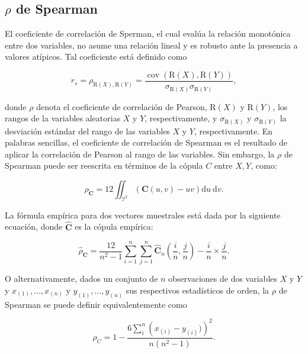 \subsection{$\rho$ de Spearman}

El coeficiente de correlación de Sperman, el cual evalúa la relación monotónica entre dos variables, no asume una relación lineal y es robusto ante la presencia a valores atípicos. Tal coeficiente está definido como

\begin{equation}\label{corSpear}
    r_s=\rho_{\mathrm{R}(X), \mathrm{R}(Y)}=\frac{\operatorname{cov}(\mathrm{R}(X), \mathrm{R}(Y))}{\sigma_{\mathrm{R}(X)} \sigma_{\mathrm{R}(Y)}},
\end{equation}

donde $\rho$ denota el coeficiente de correlación de Pearson, $\mathrm{R}(X)$ y $\mathrm{R}(Y)$, los rangos de la variables aleatorias $X$ y $Y$, respectivamente, y $\sigma_{\mathrm{R}(X)}$ y $\sigma_{\mathrm{R}(Y)}$ la desviación estándar del rango de las variables $X$ y $Y$, respectivamente. En palabras sencillas, el coeficiente de correlación de Spearman es el resultado de aplicar la correlación de Pearson al rango de las variables. Sin embargo, la $\rho$ de Spearman puede ser reescrita en términos de la cópula $C$ entre $X, Y$, como:

\begin{equation}\label{SpearTeo}
    \rho_{\mathbf{C}}=12 \iint_{\mathcal{I}^2} (\mathbf{C}(u, v)-u v) \mathrm{d} u \mathrm{~d} v.
\end{equation}

La fórmula empírica para dos vectores muestrales está dada por la siguiente ecuación, donde $\hat{\mathbf{C}}$ es la cópula empírica: 

\begin{equation}\label{Spearemp}
    \hat{\rho}_{\mathbf{C}}=\frac{12}{n^2-1} \sum_{i=1}^n \sum_{j=1}^n\hat{\mathbf{C}}_n\left(\frac{i}{n}, \frac{j}{n}\right)-\frac{i}{n} \times \frac{j}{n}.
\end{equation}

O alternativamente, dados un conjunto de $n$ observaciones de dos variables $X$ y $Y$ y $x_{(1)}, \dots, x_{(n)}$ y $y_{(1)}, \dots, y_{(n)}$ sus respectivos estadísticos de orden, la $\rho$ de Spearman se puede definir equivalentemente como

\begin{equation}
    \rho_C = 1 - \frac{6 \sum_{i}^{n} \left (  x_{(i)} - y_{(i)}) \right )^{2}}{n(n^{2} - 1)}.
\end{equation}

